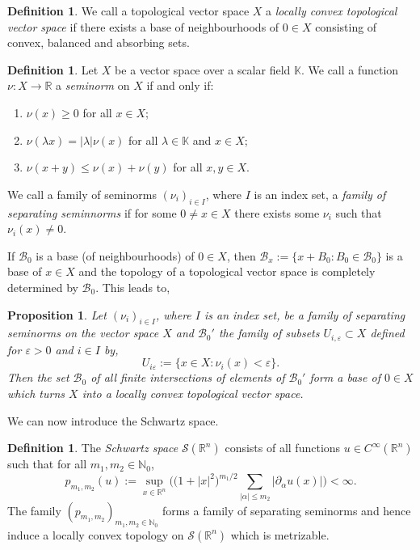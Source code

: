 \documentclass[a4paper, 12pt]{report}
\theoremstyle{cor}
\newtheorem{prop}[theorem]{Proposition}
\theoremstyle{remark}
\theoremstyle{definition}
\newtheorem{defn}[theorem]{Definition}
\begin{document}
\begin{defn}
We call a topological vector space $X$ a \emph{locally convex topological vector space} if there exists a base of neighbourhoods of $0 \in X$ consisting of convex, balanced and absorbing sets.
\end{defn}

\begin{defn}
Let $X$ be a vector space over a scalar field $\mathbb{K}$.  We call a function $\nu : X \to \mathbb{R}$ a \emph{seminorm} on $X$ if and only if:
\begin{enumerate}
\item $\nu(x) \ge 0$ for all $x \in X$;

\item $\nu(\lambda x) = |\lambda|\nu(x)$ for all $\lambda \in \mathbb{K}$ and $x \in X$;

\item $\nu(x + y) \le \nu(x) + \nu(y)$ for all $x, y \in X$.
\end{enumerate}
We call a family of seminorms $(\nu_i)_{i \in I}$, where $I$ is an index set, a \emph{family of separating seminnorms} if for some $0 \ne x \in X$ there exists some $\nu_i$ such that $\nu_i(x) \ne 0$.
\end{defn}

If $\mathcal{B}_0$ is a base (of neighbourhoods) of $0 \in X$, then $\mathcal{B}_x := \{x + B_0 : B_0 \in \mathcal{B}_0\}$ is a base of $x \in X$ and the topology of a topological vector space is completely determined by $\mathcal{B}_0$.  This leads to,
\begin{prop}
Let $(\nu_i)_{i \in I}$, where $I$ is an index set, be a family of separating seminorms on the vector space $X$ and $\mathcal{B}_0'$ the family of subsets $U_{i, \varepsilon} \subset X$ defined for $\varepsilon > 0$ and $i \in I$ by,
$$
U_{i \varepsilon} := \{x \in X : \nu_i(x) < \varepsilon\}.
$$
Then the set $\mathcal{B}_0$ of all finite intersections of elements of $\mathcal{B}_0'$ form a base of $0 \in X$ which turns $X$ into a locally convex topological vector space.
\end{prop}

We can now introduce the Schwartz space.

\begin{defn}
The \emph{Schwartz space} $\mathcal{S}(\mathbb{R}^n)$ consists of all functions $u \in C^\infty(\mathbb{R}^n)$ such that for all $m_1, m_2 \in \mathbb{N}_0$,
\begin{equation}
p_{m_1, m_2}(u) := \sup_{x \in \mathbb{R}^n}\bigg(\big(1 + |x|^2\big)^{m_1/2}\sum_{|\alpha| \le m_2}|\partial_\alpha u(x)|\bigg) < \infty.
\end{equation}
The family $(p_{m_1, m_2})_{m_1, m_2 \in \mathbb{N}_0}$ forms a family of separating seminorms and hence induce a locally convex topology on $\mathcal{S}(\mathbb{R}^n)$ which is metrizable.
\end{defn}
\end{document}
